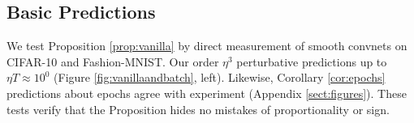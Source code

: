 \documentclass{article}
\theoremstyle{plain}
\theoremstyle{definition}
\begin{document}

    \subsection{Basic Predictions}
        We test Proposition \ref{prop:vanilla} by direct measurement of smooth
        convnets on CIFAR-10 and Fashion-MNIST.  Our order $\eta^3$
        perturbative predictions up to $\eta T \approx 10^0$ (Figure
        \ref{fig:vanillaandbatch}, left).  Likewise, Corollary \ref{cor:epochs}
        predictions about epochs agree with experiment (Appendix
        \ref{sect:figures}).  These tests verify that the Proposition
        hides no mistakes of proportionality or sign.  

\end{document}
